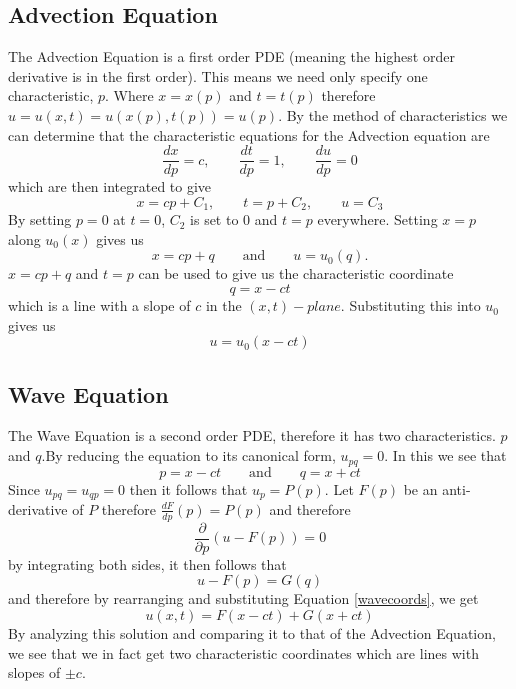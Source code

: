 \subsection{Advection Equation}
The Advection Equation is a first order PDE (meaning the highest order derivative is in the first order). This means we need only specify one characteristic, $p$. Where $x = x(p)$ and $t = t(p)$ therefore $u = u(x,t) = u(x(p),t(p)) = u(p)$.
\linebreak
\linebreak
By the method of characteristics we can determine that the characteristic equations for the Advection equation are
\begin{equation}
 \frac{dx}{dp} = c, \qquad \frac{dt}{dp} = 1, \qquad \frac{du}{dp} = 0
\end{equation}
which are then integrated to give
\begin{equation}
  x = cp + C_1, \qquad t = p + C_2, \qquad u = C_3
\end{equation}
By setting $p=0$ at $t=0$, $C_2$ is set to 0 and $t=p$ everywhere. Setting $x=p$ along $u_0(x)$ gives us 
\begin{equation}
 x=cp+q \qquad \text{and} \qquad u=u_0(q).
\end{equation}
\linebreak
\linebreak
$x=cp+q$ and $t=p$ can be used to give us the characteristic coordinate 
\begin{equation}
 q=x-ct
\end{equation}
which is a line with a slope of $c$ in the $(x,t)-plane$. Substituting this into $u_0$ gives us
\begin{equation}
  u = u_0(x - ct)
\end{equation}
\subsection{Wave Equation}
The Wave Equation is a second order PDE, therefore it has two characteristics. $p$ and
$q$.By reducing the equation to its canonical form, $u_{pq} = 0$. In this we see that 
\begin{equation} \label{wavecoords}
 p = x-ct \qquad \text{and} \qquad q = x + ct
\end{equation}
Since $u_{pq} = u_{qp} = 0$ then it follows that $u_p = P(p)$. Let $F(p)$ be an anti-derivative of $P$ therefore $\frac{dF}{dp}(p) = P(p)$ and therefore 
\begin{equation}
 \frac{\partial}{\partial p}(u - F(p)) = 0
\end{equation}
by integrating both sides, it then follows that
\begin{equation}
 u - F(p) = G(q)
\end{equation}
and therefore by rearranging and substituting Equation \ref{wavecoords}, we get
\begin{equation}
 u(x,t) = F(x-ct) + G(x+ct)
\end{equation}
By analyzing this solution and comparing it to that of the Advection Equation, we see that we in fact get two characteristic coordinates which are lines with slopes of $\pm c$.
